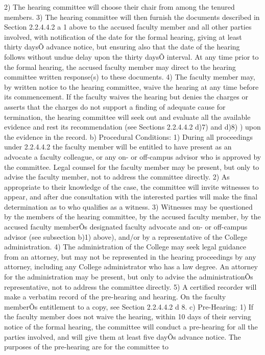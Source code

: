 \documentclass[letterpaper, 11pt]{article}
\begin{document}
	2) The hearing committee will choose their chair from among the tenured members.
	3) The hearing committee will then furnish the documents described in Section 2.2.4.4.2 a 1 above to the accused faculty member and all other parties involved, with notification of the date for the formal hearing, giving at least thirty daysÕ advance notice, but ensuring also that the date of the hearing follows without undue delay upon the thirty daysÕ interval.  At any time prior to the formal hearing, the accused faculty member may direct to the hearing committee written response(s) to these documents.
	4) The faculty member may, by written notice to the hearing committee, waive the hearing at any time before its commencement.  If the faculty waives the hearing but denies the charges or asserts that the charges do not support a finding of adequate cause for termination, the hearing committee will seek out and evaluate all the available evidence and rest its recommendation (see Sections 2.2.4.4.2 d)7) and d)8) ) upon the evidence in the record.
	b) Procedural Conditions:
	1) During all proceedings under 2.2.4.4.2 the faculty member will be entitled to have present as an advocate a faculty colleague, or any on- or off-campus advisor who is approved by the committee.  Legal counsel for the faculty member may be present, but only to advise the faculty member, not to address the committee directly.
	2) As appropriate to their knowledge of the case, the committee will invite witnesses to appear, and after due consultation with the interested parties will make the final determination as to who qualifies as a witness.
	3) Witnesses may be questioned by the members of the hearing committee, by the accused faculty member, by the accused faculty memberÕs designated faculty advocate and on- or off-campus advisor (see subsection b)1) above), and/or by a representative of the College administration.
	4) The administration of the College may seek legal guidance from an attorney, but may not be represented in the hearing proceedings by any attorney, including any College administrator who has a law degree.  An attorney for the administration may be present, but only to advise the administrationÕs representative, not to address the committee directly.
	5) A certified recorder will make a verbatim record of the pre-hearing and hearing.
		{On the faculty memberÕs entitlement to a copy, see Section 2.2.4.4.2 d 8. }
	c) Pre-Hearing:
	1) If the faculty member does not waive the hearing, within 10 days of their serving notice of the formal hearing, the committee will conduct a pre-hearing for all the parties involved, and will give them at least five dayÕs advance notice.  The purposes of the pre-hearing are for the committee to
\end{document}
